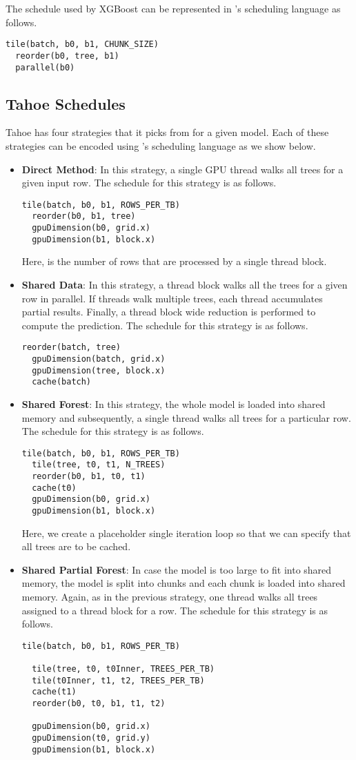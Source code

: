The schedule used by XGBoost can be represented in \Treebeard{}'s scheduling 
language as follows.
\begin{lstlisting}[style=c++]
  tile(batch, b0, b1, CHUNK_SIZE)
  reorder(b0, tree, b1)
  parallel(b0)
\end{lstlisting}

\subsection{Tahoe Schedules}
Tahoe\cite{Tahoe} has four strategies that it picks from for a given model. 
Each of these strategies can be encoded using \Treebeard{}'s scheduling language
as we show below. 
\begin{itemize}
  \item \textbf{Direct Method}: In this strategy, a single GPU thread walks all trees
  for a given input row. The schedule for this strategy is as follows.
\begin{lstlisting}[style=c++]
  tile(batch, b0, b1, ROWS_PER_TB)
  reorder(b0, b1, tree)
  gpuDimension(b0, grid.x)
  gpuDimension(b1, block.x)
\end{lstlisting}
  Here,  is the number of rows that are processed by a single thread block.
  \item \textbf{Shared Data}: In this strategy, a thread block walks all the trees 
  for a given row in parallel. If threads walk multiple trees, each thread accumulates
  partial results. Finally, a thread block wide reduction is performed to compute 
  the prediction. The schedule for this strategy is as follows.
\begin{lstlisting}[style=c++]
  reorder(batch, tree)
  gpuDimension(batch, grid.x)
  gpuDimension(tree, block.x)
  cache(batch)
\end{lstlisting}
  \item \textbf{Shared Forest}: In this strategy, the whole model is loaded into 
  shared memory and subsequently, a single thread walks all trees for a particular
  row. The schedule for this strategy is as follows.
\begin{lstlisting}[style=c++]
  tile(batch, b0, b1, ROWS_PER_TB)
  tile(tree, t0, t1, N_TREES)
  reorder(b0, b1, t0, t1)
  cache(t0)
  gpuDimension(b0, grid.x)
  gpuDimension(b1, block.x)
\end{lstlisting}
  Here, we create a placeholder single iteration loop  so that we can 
  specify that all trees are to be cached.
  \item \textbf{Shared Partial Forest}: In case the model is too large to fit into
  shared memory, the model is split into chunks and each chunk is loaded into shared
  memory. Again, as in the previous strategy, one thread walks all trees assigned to
  a thread block for a row. The schedule for this strategy is as follows.
\begin{lstlisting}[style=c++]
  tile(batch, b0, b1, ROWS_PER_TB)
  
  tile(tree, t0, t0Inner, TREES_PER_TB)
  tile(t0Inner, t1, t2, TREES_PER_TB)
  cache(t1)
  reorder(b0, t0, b1, t1, t2)

  gpuDimension(b0, grid.x)
  gpuDimension(t0, grid.y)
  gpuDimension(b1, block.x)
\end{lstlisting}
\end{itemize}


